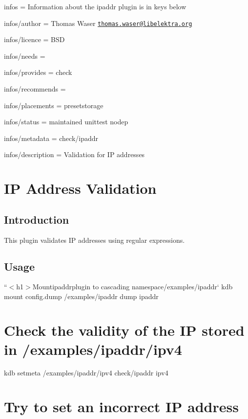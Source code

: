 
\begin{DoxyItemize}
\item infos = Information about the ipaddr plugin is in keys below
\item infos/author = Thomas Waser \href{mailto:thomas.waser@libelektra.org}{\tt thomas.\+waser@libelektra.\+org}
\item infos/licence = B\+SD
\item infos/needs =
\item infos/provides = check
\item infos/recommends =
\item infos/placements = presetstorage
\item infos/status = maintained unittest nodep
\item infos/metadata = check/ipaddr
\item infos/description = Validation for IP addresses
\end{DoxyItemize}\hypertarget{md_src_plugins_ipaddr_README_src_plugins_ipaddr_README_md}{}\section{I\+P Address Validation}\label{md_src_plugins_ipaddr_README_src_plugins_ipaddr_README_md}
\subsection*{Introduction}

This plugin validates IP addresses using regular expressions.

\subsection*{Usage}

``{\ttfamily  $<$h1$>$Mount}ipaddr{\ttfamily plugin to cascading namespace}/examples/ipaddr` kdb mount config.\+dump /examples/ipaddr dump ipaddr

\section*{Check the validity of the IP stored in {\ttfamily /examples/ipaddr/ipv4}}

kdb setmeta /examples/ipaddr/ipv4 check/ipaddr ipv4

\section*{Try to set an incorrect IP address}


